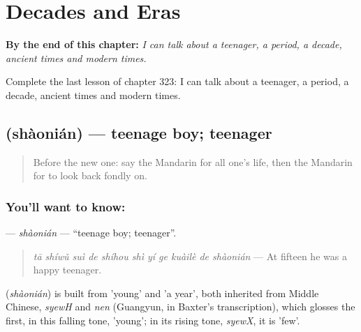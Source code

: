 
\chapter{Decades and Eras}
\label{ch:zh-decades-and-eras}

\begin{chapteropening}
\textbf{By the end of this chapter:} \emph{I can talk about a teenager, a period, a decade, ancient times and modern times.}

Complete the last lesson of chapter 323: I can talk about a teenager, a period, a decade, ancient times and modern times.
\end{chapteropening}

\section[\texorpdfstring{\zh{少年} (shàonián)}{少年 (shàonián)}]{ (shàonián) — teenage boy; teenager}

\label{lesson:ZH-C323-shaonian}



\begin{quote}
Before the new one: say the Mandarin for all one's life, then the Mandarin for to look back fondly on.
\end{quote}

\subsection*{You'll want to know: }
\textbf{} — \emph{shàonián} — \textquotedblleft{}teenage boy; teenager\textquotedblright{}.

\begin{quote}
\textbf{} \emph{tā shíwǔ suì de shíhou shì yí ge kuàilè de shàonián} — At fifteen he was a happy teenager.
\end{quote}

\begin{cousinweb}
\textbf{} (\emph{shàonián}) is built from  'young' and  'a year', both inherited from Middle Chinese, \emph{syewH} and \emph{nen} (Guangyun, in Baxter's transcription), which glosses the first, in this falling tone, 'young'; in its rising tone, \emph{syewX}, it is 'few'.
\end{cousinweb}

